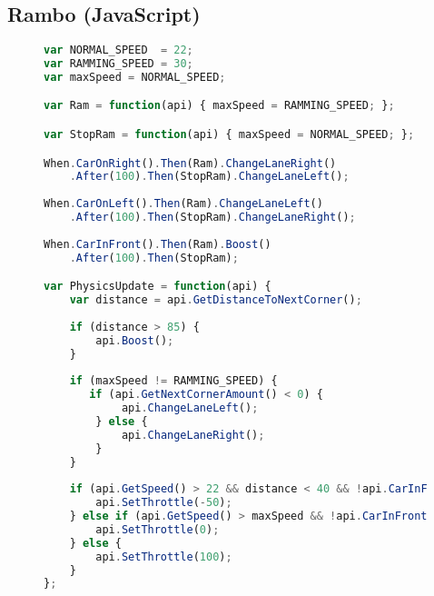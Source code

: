 \subsection{Rambo (JavaScript)}
\label{rambo}
\begin{figure}[H]
\begin{lstlisting}[language=JavaScript]
var NORMAL_SPEED  = 22;
var RAMMING_SPEED = 30;
var maxSpeed = NORMAL_SPEED; 

var Ram = function(api) { maxSpeed = RAMMING_SPEED; };

var StopRam = function(api) { maxSpeed = NORMAL_SPEED; };

When.CarOnRight().Then(Ram).ChangeLaneRight()
    .After(100).Then(StopRam).ChangeLaneLeft();
    
When.CarOnLeft().Then(Ram).ChangeLaneLeft()
    .After(100).Then(StopRam).ChangeLaneRight();
    
When.CarInFront().Then(Ram).Boost()
    .After(100).Then(StopRam);

var PhysicsUpdate = function(api) { 
    var distance = api.GetDistanceToNextCorner(); 
    
    if (distance > 85) { 
        api.Boost(); 
    }
    
    if (maxSpeed != RAMMING_SPEED) {
       if (api.GetNextCornerAmount() < 0) { 
            api.ChangeLaneLeft(); 
        } else { 
            api.ChangeLaneRight(); 
        } 
    }
    
    if (api.GetSpeed() > 22 && distance < 40 && !api.CarInFront()) { 
        api.SetThrottle(-50); 
    } else if (api.GetSpeed() > maxSpeed && !api.CarInFront()) { 
        api.SetThrottle(0); 
    } else {
        api.SetThrottle(100);
    }
};
\end{lstlisting}
\end{figure}

